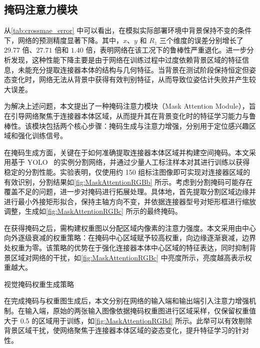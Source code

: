 \documentclass{Diploma}
\begin{document}
\subsection[MaskAttentionModule]{掩码注意力模块}
从\ref{tab:crossmae_error} 中可以看出，在模拟实际部署环境中背景保持不变的条件下，网络的预测精度显著下降。其中，$x$、$y$ 和 $R_z$ 三个维度的误差分别增长了 $29.77$ 倍、$27.71$ 倍和 $1.40$ 倍，表明网络在该工况下的鲁棒性严重退化。进一步分析发现，这种性能下降主要是由于网络在训练过程中过度依赖背景区域的特征信息，未能充分提取连接器本体的结构与几何特征。当背景在测试阶段保持恒定但姿态变化时，网络无法从背景中获得有效判别特征，从而导致位姿估计失败并产生较大误差。

为解决上述问题，本文提出了一种掩码注意力模块（Mask Attention Module），旨在引导网络聚焦于连接器本体区域，从而提升其在背景变化时的特征学习能力与鲁棒性。该模块包括两个核心步骤：掩码生成与注意力增强，分别用于定位感兴趣区域和强化训练信号。

在掩码生成方面，关键在于如何准确提取连接器本体区域并构建空间掩码。本文采用基于 YOLO~\cite{redmon2016you} 的实例分割网络，并通过少量人工标注样本对其进行训练以获得稳定的分割性能。实验表明，仅使用约 150 组标注图像即可实现对连接器区域的有效识别，分割结果如\ref{fig:MaskAttentionRGBb} 所示。考虑到分割掩码可能存在覆盖不足的问题，进一步对掩码进行拓展处理。具体地，首先提取分割区域边缘并进行最小外接矩形拟合，保持主轴方向不变，并依据连接器型号对矩形框进行缩放调整，生成如\ref{fig:MaskAttentionRGBc} 所示的最终掩码。

在获得掩码之后，需构建权重图以分配区域内像素的注意力强度。本文采用由中心向外逐级衰减的权重策略：在掩码中心区域赋予较高权重，向边缘逐渐衰减，边界处权重为零。该策略的优势在于强化连接器本体中心区域的特征表达，同时抑制背景区域对网络的干扰，如\ref{fig:MaskAttentionRGBc} 中亮度所示，亮度越高表示权重越大。

\begin{subfigures}[MaskAttentionRGB]{视觉掩码权重生成策略}
\end{subfigures}

在完成掩码与权重图生成后，本文分别在网络的输入端和输出端引入注意力增强机制。在输入端，原始的两张输入图像依据掩码权重图进行区域采样，仅保留权重值大于 0.5 的区域用于训练，如\ref{fig:MaskAttentionRGBd} 所示。此举可以有效剔除背景区域干扰，使网络聚焦于连接器本体区域的姿态变化，提升特征学习的针对性。
\end{document}
